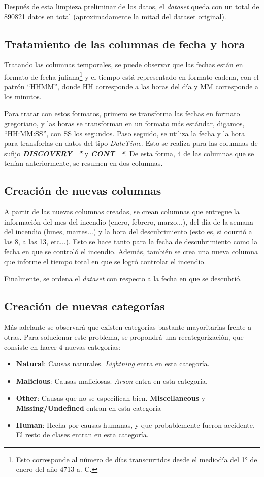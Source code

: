 Después de esta limpieza preliminar de los datos, el \textit{dataset} queda con un total de 890821 datos en total (aproximadamente la mitad del dataset original).

\subsection{Tratamiento de las columnas de fecha y hora}
Tratando las columnas temporales, se puede observar que las fechas están en formato de fecha juliana\footnote{Esto corresponde al número de días transcurridos desde el mediodía del 1° de enero del año 4713 a. C.} y el tiempo está representado en formato cadena, con el patrón ``HHMM'', donde HH corresponde a las horas del día y MM corresponde a los minutos. 

Para tratar con estos formatos, primero se transforma las fechas en formato gregoriano, y las horas se transforman en un formato más estándar, digamos, ``HH:MM:SS'', con SS los segundos. Paso seguido, se utiliza la fecha y la hora para transforlas en datos del tipo \textit{DateTime}. Esto se realiza para las columnas de sufijo \textit{\textbf{DISCOVERY\_*}} y \textit{\textbf{CONT\_*}}. De esta forma, 4 de las columnas que se tenían anteriormente, se resumen en dos columnas.

\subsection{Creación de nuevas columnas}
A partir de las nuevas columnas creadas, se crean columnas que entregue la información del mes del incendio (enero, febrero, marzo...), del día de la semana del incendio (lunes, martes...) y la hora del descubrimiento (esto es, si ocurrió a las 8, a las 13, etc...). Esto se hace tanto para la fecha de descubrimiento como la fecha en que se controló el incendio. Además, también se crea una nueva columna que informe el tiempo total en que se logró controlar el incendio. 

Finalmente, se ordena el \textit{dataset} con respecto a la fecha en que se descubrió.

\subsection{Creación de nuevas categorías}\label{subsec:nuevas-cats}
Más adelante se observará que existen categorías bastante mayoritarias frente a otras. Para solucionar este problema, se propondrá una recategorización, que consiste en hacer 4 nuevas categorías:
\begin{itemize}
    \item \textbf{Natural}: Causas naturales. \textit{Lightning} entra en esta categoría.
    \item \textbf{Malicious}: Causas maliciosas. \textit{Arson} entra en esta categoría.
    \item \textbf{Other}: Causas que no se especifican bien. \textbf{Miscellaneous} y \textbf{Missing/Undefined} entran en esta categoría
    \item \textbf{Human}: Hecha por causas humanas, y que probablemente fueron accidente. El resto de clases entran en esta categoría.
\end{itemize}


